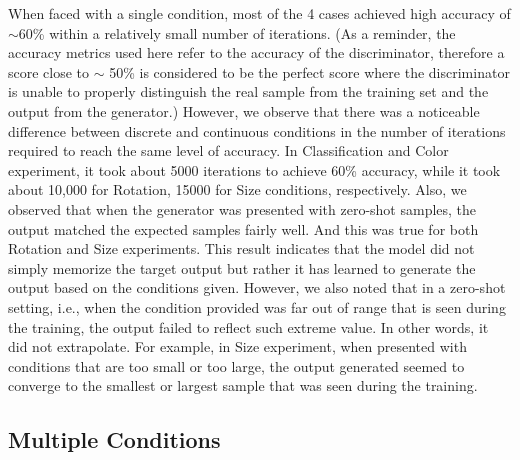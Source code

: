 \documentclass[11pt, letterpaper, oneside]{article}
\begin{document}
When faced with a single condition, most of the 4 cases achieved high accuracy of $\sim 60$\% within a relatively small number of iterations. (As a reminder, the accuracy metrics used here refer to the accuracy of the discriminator, therefore a score close to $\sim$ 50\% is considered to be the perfect score where the discriminator is unable to properly distinguish the real sample from the training set and the output from the generator.) However, we observe that there was a noticeable difference between discrete and continuous conditions in the number of iterations required to reach the same level of accuracy. In Classification and Color experiment, it took about 5000 iterations to achieve 60\% accuracy, while it took about 10,000 for Rotation, 15000 for Size conditions, respectively.   
Also, we observed that when the generator was presented with zero-shot samples, the output matched the expected samples fairly well. And this was true for both Rotation and Size experiments. This result indicates that the model did not simply memorize the target output but rather it has learned to generate the output based on the conditions given. However, we also noted that in a zero-shot setting, i.e., when the condition provided was far out of range that is seen during the training, the output failed to reflect such extreme value. In other words, it did not extrapolate. For example, in Size experiment, when presented with conditions that are too small or too large, the output generated seemed to converge to the smallest or largest sample that was seen during the training. 

\subsection{Multiple Conditions}
    
    
\end{document}
